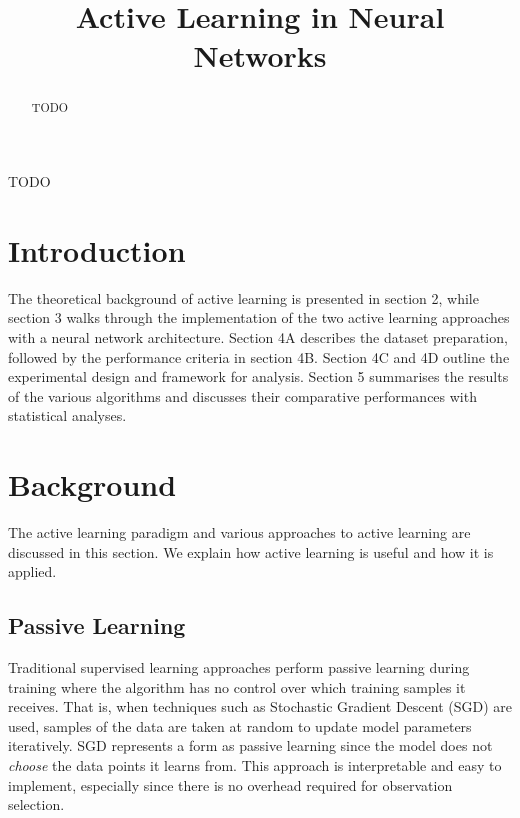 \documentclass[10pt, conference]{IEEEtran}
\begin{document}
\title{Active Learning in Neural Networks\\

}

\author{
}

\maketitle

\begin{abstract}
TODO
\end{abstract}

\begin{IEEEkeywords}
TODO
\end{IEEEkeywords}

\section{Introduction}


The theoretical background of active learning is presented in section 2, while section 3 walks through the implementation of the two active learning approaches with a neural network architecture. Section 4A describes the dataset preparation, followed by the performance criteria in section 4B. Section 4C and 4D outline the experimental design and framework for analysis. Section 5 summarises the results of the various algorithms and discusses their comparative performances with statistical analyses.

\section{Background}
The active learning paradigm and various approaches to active learning are discussed in this section. We explain how active learning is useful and how it is applied.

\subsection{Passive Learning}
Traditional supervised learning approaches perform passive learning during training where the algorithm has no control over which training samples it receives. That is, when techniques such as Stochastic Gradient Descent (SGD) are used, samples of the data are taken at random to update model parameters iteratively. SGD represents a form as passive learning since the model does not \textit{choose} the data points it learns from. This approach is interpretable and easy to implement, especially since there is no overhead required for observation selection.
\end{document}
